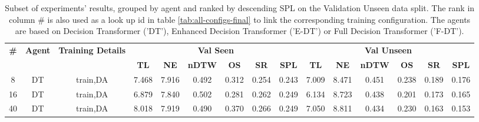 \begin{table}
\centering
\caption{\label{tab:dagger_prob}Subset of experiments' results, grouped by agent and ranked by descending SPL on the Validation Unseen data split. The rank in column \# is also used as a look up id in table \ref{tab:all-configs-final} to link the corresponding training configuration.     \newline The agents are based on Decision Transformer ('DT'), Enhanced Decision Transformer ('E-DT') or Full Decision Transformer ('F-DT').}
\begin{tabular}{@{\hskip3pt}c@{\hskip3pt}c@{\hskip3pt}c@{\hskip3pt}c@{\hskip3pt}c@{\hskip3pt}c@{\hskip3pt}c@{\hskip3pt}c@{\hskip3pt}c@{\hskip3pt}c@{\hskip3pt}c@{\hskip3pt}c@{\hskip3pt}c@{\hskip3pt}c@{\hskip3pt}c}
\toprule
\textbf{\#} & \textbf{Agent} & \textbf{Training Details} & \multicolumn{6}{c}{\textbf{Val Seen}} & \multicolumn{6}{c}{\textbf{Val Unseen}} \\
\cmidrule(l){4-9} \cmidrule(l){10-15} \textbf{~} &     \textbf{~} &                \textbf{~} &       \textbf{TL} & \textbf{NE} & \textbf{nDTW} & \textbf{OS} & \textbf{SR} & \textbf{SPL} &         \textbf{TL} & \textbf{NE} & \textbf{nDTW} & \textbf{OS} & \textbf{SR} & \textbf{SPL} \\
\midrule
          8 &             DT &                  train,DA &             7.468 &       7.916 &         0.492 &       0.312 &       0.254 &        0.243 &               7.009 &       8.471 &         0.451 &       0.238 &       0.189 &        0.176 \\
         16 &             DT &                  train,DA &             6.879 &       7.840 &         0.502 &       0.281 &       0.262 &        0.249 &               6.134 &       8.723 &         0.438 &       0.201 &       0.173 &        0.165 \\
         40 &             DT &                  train,DA &             8.018 &       7.919 &         0.490 &       0.370 &       0.266 &        0.249 &               7.050 &       8.811 &         0.434 &       0.230 &       0.163 &        0.153 \\
\bottomrule
\end{tabular}
\end{table}
